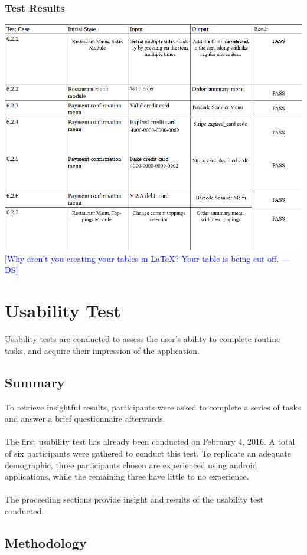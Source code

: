 \documentclass[12pt, titlepage]{article}
\newcommand{\authornote}[3]{\textcolor{#1}{[#3 ---#2]}}
\newcommand{\authornote}[3]{}
\newcommand{\ds}[1]{\authornote{blue}{DS}{#1}}
\begin{document}
\subsubsection{Test Results}
\includegraphics[width=1.2\textwidth]{orderTransactionTC.png}
\ds{Why aren't you creating your tables in \LaTeX{}? Your table is being cut off.}

\section{Usability Test}
Usability tests are conducted to assess the user's ability to complete routine tasks, and acquire their impression of the application.
\subsection{Summary}

To retrieve insightful results, participants were asked to complete a series of tasks and answer a brief questionnaire afterwards. 
\\\\
The first usability test has already been conducted on February 4, 2016. A total of six participants were gathered to conduct this test. To replicate an adequate demographic, three participants chosen are experienced using android applications, while the remaining three have little to no experience. 
\\\\
The proceeding sections provide insight and results of the usability test conducted. 

\subsection{Methodology}
\end{document}
